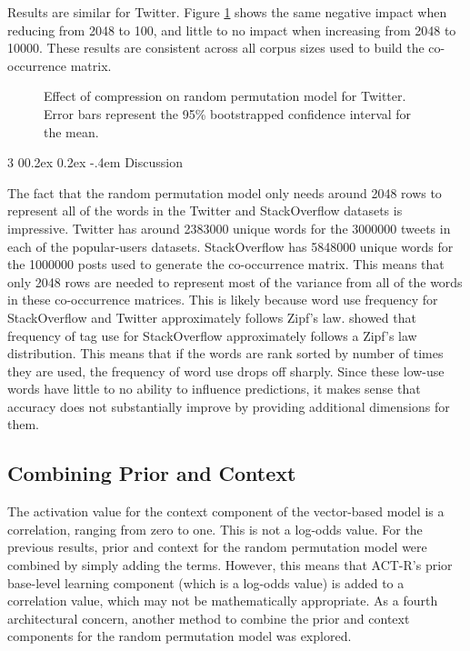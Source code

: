 \documentclass[man,floatsintext,donotrepeattitle]{apa6}
\makeatletter
\renewcommand{\subsubsection}{%
  \@startsection
  {subsubsection}%
  {3}%
  {\parindent}%
  {0\baselineskip \@plus 0.2ex \@minus 0.2ex}%
  {-.4em}%
  {\normalfont\normalsize\bfseries\addperi}}
\makeatother
\begin{document}
Results are similar for Twitter.
Figure \ref{figContextDimT} shows the same negative impact when reducing from \num{2048} to \num{100}, and little to no impact when increasing from \num{2048} to \num{10000}. 
These results are consistent across all corpus sizes used to build the co-occurrence matrix.

\begin{figure}[!htbp]
  \caption{
    Effect of compression on random permutation model for Twitter.
    Error bars represent the 95\% bootstrapped confidence interval for the mean.
  }
  \label{figContextDimT}
\end{figure}

\subsubsection{Discussion}

The fact that the random permutation model only needs around \num{2048} rows to represent all of the words in the Twitter and StackOverflow datasets is impressive.
Twitter has around \num{2383000} unique words for the \num{3000000} tweets in each of the popular-users datasets.
StackOverflow has \num{5848000} unique words for the \num{1000000} posts used to generate the co-occurrence matrix.
This means that only \num{2048} rows are needed to represent most of the variance from all of the words in these co-occurrence matrices.
This is likely because word use frequency for StackOverflow and Twitter approximately follows Zipf's law.
\textcite{Stanley2013} showed that frequency of tag use for StackOverflow approximately follows a Zipf's law distribution.
This means that if the words are rank sorted by number of times they are used, the frequency of word use drops off sharply.
Since these low-use words have little to no ability to influence predictions, it makes sense that accuracy does not substantially improve by providing additional dimensions for them.

\subsection{Combining Prior and Context}

The activation value for the context component of the vector-based model is a correlation, ranging from zero to one.
This is not a log-odds value.
For the previous results, prior and context for the random permutation model were combined by simply adding the terms.
However, this means that ACT-R's prior base-level learning component (which is a log-odds value) is added to a correlation value, which may not be mathematically appropriate.
As a fourth architectural concern, another method to combine the prior and context components for the random permutation model was explored.
\end{document}
